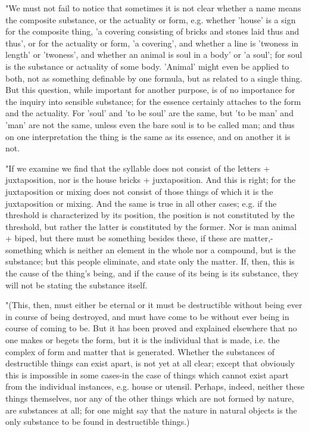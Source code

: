 "We must not fail to notice that sometimes it is not clear whether
a name means the composite substance, or the actuality or form, e.g.
whether 'house' is a sign for the composite thing, 'a covering consisting
of bricks and stones laid thus and thus', or for the actuality or
form, 'a covering', and whether a line is 'twoness in length' or 'twoness',
and whether an animal is soul in a body' or 'a soul'; for soul is
the substance or actuality of some body. 'Animal' might even be applied
to both, not as something definable by one formula, but as related
to a single thing. But this question, while important for another
purpose, is of no importance for the inquiry into sensible substance;
for the essence certainly attaches to the form and the actuality.
For 'soul' and 'to be soul' are the same, but 'to be man' and 'man'
are not the same, unless even the bare soul is to be called man; and
thus on one interpretation the thing is the same as its essence, and
on another it is not. 

"If we examine we find that the syllable does not consist of the letters
+ juxtaposition, nor is the house bricks + juxtaposition. And this
is right; for the juxtaposition or mixing does not consist of those
things of which it is the juxtaposition or mixing. And the same is
true in all other cases; e.g. if the threshold is characterized by
its position, the position is not constituted by the threshold, but
rather the latter is constituted by the former. Nor is man animal
+ biped, but there must be something besides these, if these are matter,-something
which is neither an element in the whole nor a compound, but is the
substance; but this people eliminate, and state only the matter. If,
then, this is the cause of the thing's being, and if the cause of
its being is its substance, they will not be stating the substance
itself. 

"(This, then, must either be eternal or it must be destructible without
being ever in course of being destroyed, and must have come to be
without ever being in course of coming to be. But it has been proved
and explained elsewhere that no one makes or begets the form, but
it is the individual that is made, i.e. the complex of form and matter
that is generated. Whether the substances of destructible things can
exist apart, is not yet at all clear; except that obviously this is
impossible in some cases-in the case of things which cannot exist
apart from the individual instances, e.g. house or utensil. Perhaps,
indeed, neither these things themselves, nor any of the other things
which are not formed by nature, are substances at all; for one might
say that the nature in natural objects is the only substance to be
found in destructible things.) 


